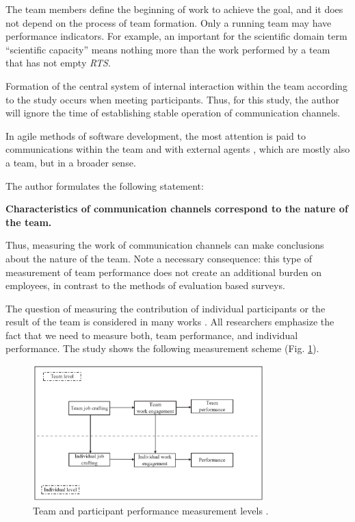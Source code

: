\documentclass[12pt]{report}
\theoremstyle{definition}
\begin{document}
The team members define the beginning of work to achieve the goal, and it does not depend on the process of team formation. 
Only a running team may have performance indicators. 
For example, an important for the scientific domain term  ``scientific capacity''  means nothing more than the work performed by a team that has not empty \emph{RTS}.

Formation of the central system of internal interaction within the team according to the study \cite{harper1985power} occurs when meeting participants.
Thus, for this study, the author will ignore the time of establishing stable operation of communication channels.

In agile methods of software development, the most attention is paid to communications within the  team  \cite{boehm2003people} and with external agents \cite{paasivaara2012experiences}, which are mostly also a team, but in a broader sense.

The author formulates the following statement:

\textbf{Characteristics of communication channels correspond to the nature of the team.}

Thus, measuring the work of communication channels can make conclusions about the nature of the team.
Note a necessary consequence: this type of measurement of team performance does not create an additional burden on employees, in contrast to the methods of evaluation based surveys.

The question of measuring the contribution of individual participants or the result of the team is considered in many works \cite{tannenbaum2013team,hill1982group}. 
All researchers emphasize the fact that we need to measure both, team performance, and individual performance.
The study \cite{tims2013job} shows the following measurement scheme (Fig. \ref{fig:ex9}).

\begin{figure}[ht]
	\centering
	\includegraphics[width=0.8\textwidth]{scrum-img9}
	\caption{Team and participant performance measurement levels \cite{tims2013job}.}
	\label{fig:ex9}
\end{figure}
\end{document}
